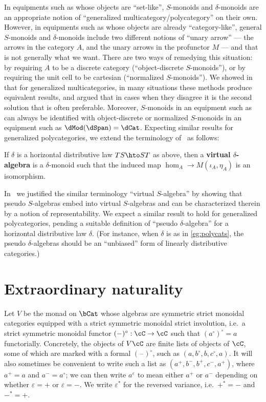 \documentclass{amsart}
\newcommand{\C}{\cC}
\newcommand{\blank}{\mathord{\hspace{1pt}\text{--}\hspace{1pt}}}
\renewcommand{\o}{^{\circ}}
\newcommand{\p}{^{+}}
\newcommand{\m}{^{-}}
\newcommand{\e}[1][]{^{\varepsilon_{#1}}}
\begin{document}
In equipments such as \dSpan whose objects are ``set-like'', $S$-monoids and $\delta$-monoids are an appropriate notion of ``generalized multicategory/polycategory'' on their own.
However, in equipments such as \dCat whose objects are already ``category-like'', general $S$-monoids and $\delta$-monoids include two different notions of ``unary arrow'' --- the arrows in the category $A$, and the unary arrows in the profunctor $M$ --- and that is not generally what we want.
There are two ways of remedying this situation: by requiring $A$ to be a discrete category (``object-discrete $S$-monoids''), or by requiring the unit cell to be cartesian (``normalized $S$-monoids'').
We showed in~\cite{cs:multicats} that for generalized multicategories, in many situations these methods produce equivalent results, and argued that in cases when they disagree it is the second solution that is often preferable.
Moreover, $S$-monoids in an equipment such as \dSpan can always be identified with object-discrete or normalized $S$-monoids in an equipment such as $\dMod(\dSpan) = \dCat$.
Expecting similar results for generalized polycategories, we extend the terminology of~\cite{cs:multicats} as follows:

\begin{defn}
  If $\delta$ is a horizontal distributive law $TS \hto ST$ as above, then a \textbf{virtual $\delta$-algebra} is a $\delta$-monoid such that the induced map $\hom_A \to M(\iota_A,\eta_A)$ is an isomorphism.
\end{defn}

In~\cite{cs:multicats} we justified the similar terminology ``virtual $S$-algebra'' by showing that pseudo $S$-algebras embed into virtual $S$-algebras and can be characterized therein by a notion of representability.
We expect a similar result to hold for generalized polycategories, pending a suitable definition of ``pseudo $\delta$-algebra'' for a horizontal distributive law $\delta$.
(For instance, when $\delta$ is as in \cref{eg:polycats}, the pseudo $\delta$-algebras should be an ``unbiased'' form of linearly distributive categories.)


\section{Extraordinary naturality}
\label{sec:extranat}

Let $V$ be the monad on $\bCat$ whose algebras are symmetric strict monoidal categories equipped with a strict symmetric monoidal strict involution, i.e.\ a strict symmetric monoidal functor $(-)\o : \C\to\C$ such that $(a\o)\o =a$ functorially.
Concretely, the objects of $V\C$ are finite lists of objects of $\C$, some of which are marked with a formal $(\blank)\o$, such as $(a,b\o,b,c\o,a)$.
It will also sometimes be convenient to write such a list as $(a\p,b\m,b\p,c\m,a\p)$, where $a\p=a$ and $a\m=a\o$; we can then write $a\e$ to mean either $a\p$ or $a\m$ depending on whether $\varepsilon=+$ or $\varepsilon=-$.
We write $\varepsilon^*$ for the reversed variance, i.e.\ $+^*=-$ and $-^*=+$.
\end{document}
